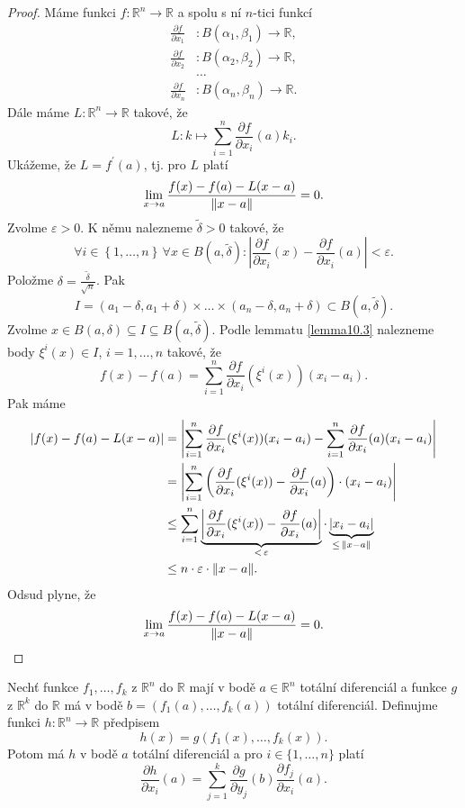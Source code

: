 \begin{proof}
	Máme funkci $f:\mathbb R ^n \to \mathbb R $ a spolu s ní $n$-tici funkcí
	\begin{align*}
	\frac{\partial f }{\partial x_1} &: B(\alpha_1,\beta_1) \to \mathbb R , \\
	\frac{\partial f }{\partial x_2} &: B(\alpha_2,\beta_2) \to \mathbb R , \\
	& \dots\\
\frac{\partial f }{\partial x_n} &: B(\alpha_n,\beta_n) \to \mathbb R .
	\end{align*}
	Dále máme $L: \mathbb R ^n \to \mathbb R $ takové, že
	$$
	    L: k \mapsto \sum_{i=1}^n \frac{\partial f }{\partial x_i}(a)k_i.
	$$
	Ukážeme, že $L = f^\prime(a)$, tj. pro $L$ platí
	$$
 \lim_{x \to a} \frac{f(x)-f(a)-L(x-a)}{\lVert x-a \rVert} = 0.
	$$
	Zvolme $\varepsilon>0$. K němu nalezneme $\tilde \delta >0$ takové, že
	$$
	    \forall i \in \left \{ 1, \dots, n \right \} \, \forall x \in B(a,\tilde \delta): \left | \frac{\partial f }{\partial x_i }(x) - \frac{\partial f }{\partial x_i} (a) \right |  <\varepsilon.
	$$
	Položme $\delta =\frac{\tilde \delta }{\sqrt n}$. Pak
	$$
	    I = (a_1-\delta, a_1+\delta)\times \dots \times (a_n-\delta,a_n+ \delta) \subset B(a,\tilde\delta).
	$$
	Zvolme $x \in B(a,\delta) \subseteq I \subseteq B(a,\tilde \delta)$. Podle lemmatu
	\ref{lemma10.3} nalezneme body $\xi^i (x)\in I$, $i =1,\dots,n $ takové, že
	$$
	    f(x)-f(a) = \sum_{i=1}^n \frac{\partial f }{\partial x_i} (\xi^i (x))(x_i-a_i).
	$$
	Pak máme
	\begin{align*}
	|f(x)-f(a)-L(x-a)|&=\left | \sum_{i=1}^n \frac{\partial f }{\partial x_i} (\xi^i(x))(x_i-a_i) - \sum_{i=1}^n \frac{\partial f }{\partial x_i}(a)(x_i-a_i) \right | \\
	&= \left | \sum_{i=1}^n \left( \frac{\partial f }{\partial x_i}(\xi^i(x)) - \frac{\partial f }{\partial x_i}(a) \right ) \cdot (x_i-a_i) \right |\\
	& \leq \sum_{i=1}^n \underbrace{\left | \frac{\partial f }{\partial x_i} (\xi^i(x))-\frac{\partial f }{\partial x_i}(a) \right |}_{< \, \varepsilon}  \cdot \underbrace{|x_i-a_i|}_{\leq\,\lVert x-a \rVert}\\
	& \leq n\cdot  \varepsilon\cdot  \lVert x-a \rVert.
\end{align*}
	Odsud plyne, že
	$$
 \lim_{x \to a } \frac{f(x)-f(a)-L(x-a)}{\lVert x-a \rVert} = 0.
	$$
\end{proof}

\begin{veta}\label{veta10.5}
Nechť funkce
$
f_1,\dots,f_k
$
z $\mathbb{R}^n$ do $\mathbb{R}$
mají v bodě
$a\in\mathbb{R}^n$
totální diferenciál
a funkce $g$ z $\mathbb R ^k$ do $\mathbb R $
má v bodě
$
b=
(f_1(a),\dots,f_k(a))
$
totální diferenciál.
Definujme funkci
$h:\mathbb{R}^n\to\mathbb{R}$ předpisem
\[
h(x)
=
g(
f_1(x),
\dots,
f_k(x)
).
\]
Potom má $h$ v bodě $a$
totální diferenciál a pro
$
i\in\{1,\dots,n\}
$
platí
\[
\frac{\partial h}{\partial x_i}(a)
=
\sum_{j=1}^{k}
\frac{\partial g}{\partial y_j}(b)
\frac{\partial f_j}{\partial x_i}(a).
\]
\end{veta}
